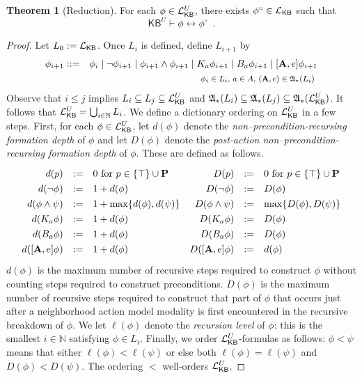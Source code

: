 \documentclass[12pt]{article}
\theoremstyle{definition}
\newtheorem{theorem}{Theorem}[section]
\newcommand{\Prop}{{\bf P}}    %
\newcommand{\Lang}{{\cal L}}   %
\newcommand{\A}{{\bf A}}
\newcommand{\Actm}{\mathfrak{A}}   %
\newcommand{\KB}{{\mathsf{KB}}}                        %
\begin{document}
\begin{theorem}[Reduction]
  \label{theorem:reduction}
  For each $\phi\in\Lang_\KB^U$, there exists
  $\phi^\circ\in\Lang_\KB$ such that
  \[
  \KB^U\vdash\phi\leftrightarrow\phi^\circ
  \enspace.
  \]
\end{theorem}
\begin{proof}
  Let $L_0:=\Lang_\KB$.  Once $L_i$ is defined, define $L_{i+1}$ by
  \begin{eqnarray*}
    \phi_{i+1} & ::= & 
    \phi_i \mid \neg\phi_{i+1} \mid \phi_{i+1}\land\phi_{i+1} \mid
    K_a\phi_{i+1} \mid B_a\phi_{i+1} \mid [\A,e]\phi_{i+1}
    \\
    &&
    \text{\footnotesize 
      $\phi_i\in L_i$,
      $a\in A$,
      $(\A,e)\in\Actm_*(L_i)$
    }
  \end{eqnarray*}
  Observe that $i\leq j$ implies $L_i\subseteq
  L_j\subseteq\Lang_\KB^U$ and
  $\Actm_*(L_i)\subseteq\Actm_*(L_j)\subseteq\Actm_*(\Lang_\KB^U)$.  It
  follows that $\Lang_\KB^U=\bigcup_{i\in\mathbb{N}}L_i$.  We define a
  dictionary ordering on $\Lang_\KB^U$ in a few steps.  First, for
  each $\phi\in\Lang_\KB^U$, let $d(\phi)$ denote the
  \emph{non--precondition-recursing formation depth} of $\phi$ and let
  $D(\phi)$ denote the \emph{post-action non--precondition-recursing
    formation depth} of $\phi$.  These are defined as follows.
  \[
  \renewcommand{\arraystretch}{1.3}
  \begin{array}[t]{rcl}
    d(p) &:=& 0 \text{ for } p\in\{\top\}\cup\Prop \\
    d(\lnot\phi) &:=& 1 + d(\phi) \\
    d(\phi\land\psi) &:=& 1 + \max\{d(\phi),d(\psi)\} \\
    d(K_a\phi) &:=& 1 + d(\phi) \\
    d(B_a\phi) &:=& 1 + d(\phi) \\
    d([\A,e]\phi) &:=& 1 + d(\phi)
  \end{array}
  \begin{array}[t]{rcl}
    D(p) &:=& 0 \text{ for } p\in\{\top\}\cup\Prop \\
    D(\lnot\phi) &:=& D(\phi) \\
    D(\phi\land\psi) &:=& \max\{D(\phi),D(\psi)\} \\
    D(K_a\phi) &:=& D(\phi) \\
    D(B_a\phi) &:=& D(\phi) \\
    D([\A,e]\phi) &:=& d(\phi)
  \end{array}
  \renewcommand{\arraystretch}{1.0}
  \]
  $d(\phi)$ is the maximum number of recursive steps required to
  construct $\phi$ without counting steps required to construct
  preconditions.  $D(\phi)$ is the maximum number of recursive steps
  required to construct that part of $\phi$ that occurs just after a
  neighborhood action model modality is first encountered in the
  recursive breakdown of $\phi$.  We let $\ell(\phi)$ denote the
  \emph{recursion level} of $\phi$: this is the smallest
  $i\in\mathbb{N}$ satisfying $\phi\in L_i$.  Finally, we order
  $\Lang_\KB^U$-formulas as follows: $\phi<\psi$ means that either
  $\ell(\phi)<\ell(\psi)$ or else both $\ell(\phi)=\ell(\psi)$ and
  $D(\phi)<D(\psi)$.  The ordering $<$ well-orders $\Lang_\KB^U$.


\end{proof}
\end{document}

